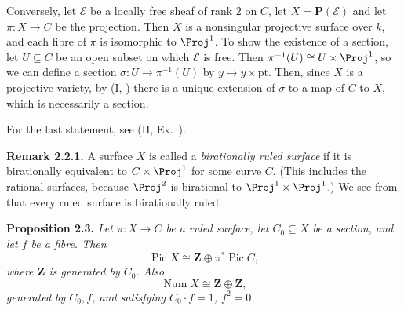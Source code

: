 {Conversely, let $\mathcal E$ be a locally free sheaf of rank $2$ on $C$, let $X=\mathbf P(\mathcal E)$ and let $\pi\colon X\to C$ be the projection. Then $X$ is a nonsingular projective surface over $k$, and each fibre of $\pi$ is isomorphic to $\Proj^1$. To show the existence of a section, let $U\subseteq C$ be an open subset on which $\mathcal E$ is free. Then $\pi^{-1}(U)\cong U\times\Proj^1$, so we can define a section $\sigma\colon U\to\pi^{-1}(U)$ by $y\mapsto y\times\mathrm{pt}$. Then, since $X$ is a projective variety, by (I, ) there is a unique extension of $\sigma$ to a map of $C$ to $X$, which is necessarily a section.

For the last statement, see (II, Ex.~).

\medskip
\noindent\hypertarget{result-V-2.2.1}{}\textbf{Remark 2.2.1.} A surface $X$ is called a \emph{birationally ruled surface} if it is birationally equivalent to $C\times\Proj^1$ for some curve $C$. (This includes the rational surfaces, because $\Proj^2$ is birational to $\Proj^1\times\Proj^1$.) We see from  that every ruled surface is birationally ruled.

\medskip
\noindent\hypertarget{result-V-2.3}{}\textbf{Proposition 2.3.} \emph{Let $\pi\colon X\to C$ be a ruled surface, let $C_0\subseteq X$ be a section, and let $f$ be a fibre. Then}
\[
\operatorname{Pic}X\cong\mathbf Z\oplus\pi^*\operatorname{Pic}C,
\]
\emph{where $\mathbf Z$ is generated by $C_0$. Also}
\[
\operatorname{Num}X\cong\mathbf Z\oplus\mathbf Z,
\]
\emph{generated by $C_0,f$, and satisfying $C_0\cdot f=1$, $f^2=0$.}
}
